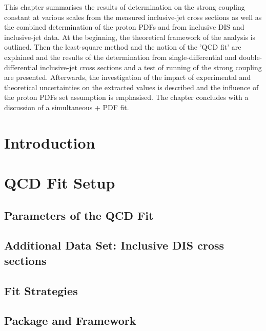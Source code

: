 This chapter summarises the results of determination on the strong coupling constant at various scales from the measured inclusive-jet cross sections as well as the combined determination of the proton PDFs and \asz from inclusive DIS and inclusive-jet data. At the beginning, the theoretical framework of the analysis is outlined. Then the least-square method and the notion of the 'QCD fit' are explained and the results of the \asz determination from single-differential and double-differential inclusive-jet cross sections and a test of running of the strong coupling are presented. Afterwards, the investigation of the impact of experimental and theoretical uncertainties on the extracted \asz values is described and the influence of the proton PDFs set assumption is emphasised. The chapter concludes with a discussion of a simultaneous \as + PDF fit.

\section{Introduction}
\label{sec:qcdfitintro}


\section{QCD Fit Setup}
\label{sec:fitsettings}


\subsection{Parameters of the QCD Fit}
\label{subsec:qcdfitparams}


\subsection{Additional Data Set: Inclusive DIS cross sections}
\label{subsec:inclusivedisdata}


\subsection{Fit Strategies}
\label{subsec:fitstategy}


\subsection{\herafitter Package and \fastnlo Framework}
\label{subsec:herfitter}


